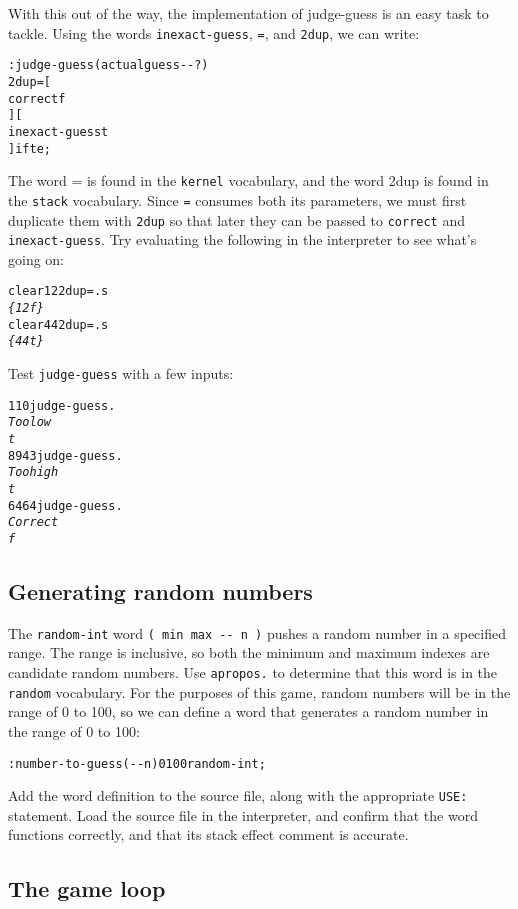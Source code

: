 \documentclass[english]{article}
\begin{document}
With this out of the way, the implementation of judge-guess is an
easy task to tackle. Using the words \texttt{inexact-guess}, \texttt{=},
and \texttt{2dup}, we can write:

\begin{alltt}
: judge-guess ( actual guess -{}- ? )
    2dup = {[}
        correct f
    {]} {[}
        inexact-guess t
    {]} ifte ;
\end{alltt}

The word = is found in the \texttt{kernel} vocabulary, and the word 2dup is found in the \texttt{stack} vocabulary. Since \texttt{=}
consumes both its parameters, we must first duplicate them with \texttt{2dup} so that later they can be passed
to \texttt{correct} and \texttt{inexact-guess}. Try evaluating the following
in the interpreter to see what's going on:

\begin{alltt}
clear 1 2 2dup = .s
\emph{\{ 1 2 f \}}
clear 4 4 2dup = .s
\emph{\{ 4 4 t \}}
\end{alltt}
Test \texttt{judge-guess} with a few inputs:

\begin{alltt}
1 10 judge-guess .
\emph{Too low}
\emph{t}
89 43 judge-guess .
\emph{Too high}
\emph{t}
64 64 judge-guess .
\emph{Correct}
\emph{f}
\end{alltt}

\subsection{Generating random numbers}

The \texttt{random-int} word \texttt{( min max -{}- n )} pushes a
random number in a specified range. The range is inclusive, so both
the minimum and maximum indexes are candidate random numbers. Use
\texttt{apropos.} to determine that this word is in the \texttt{random}
vocabulary. For the purposes of this game, random numbers will be
in the range of 0 to 100, so we can define a word that generates a
random number in the range of 0 to 100:

\begin{alltt}
: number-to-guess ( -{}- n ) 0 100 random-int ;
\end{alltt}
Add the word definition to the source file, along with the appropriate
\texttt{USE:} statement. Load the source file in the interpreter,
and confirm that the word functions correctly, and that its stack
effect comment is accurate.


\subsection{The game loop}
\end{document}
